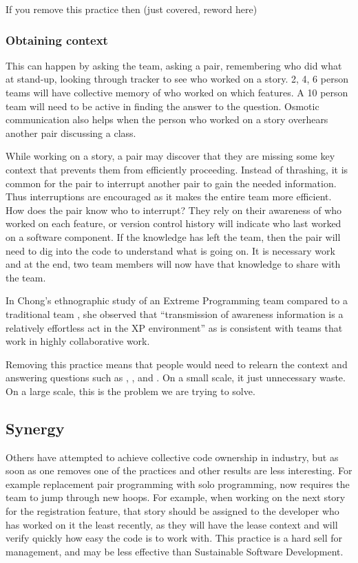 If you remove this practice then (just covered, reword here)

\subsubsection{Obtaining context}
This can happen by asking the team, asking a pair, remembering who did what at stand-up, looking through tracker to see who worked on a story. 2, 4, 6 person teams will have collective memory of who worked on which features. A 10 person team will need to be active in finding the answer to the question. Osmotic communication also helps when the person who worked on a story overhears another pair discussing a class.

While working on a story, a pair may discover that they are missing some key context that prevents them from efficiently proceeding. Instead of thrashing, it is common for the pair to interrupt another pair to gain the needed information. Thus interruptions are encouraged as it makes the entire team more efficient. How does the pair know who to interrupt? They rely on their awareness of who worked on each feature, or version control history will indicate who last worked on a software component. If the knowledge has left the team, then the pair will need to dig into the code to understand what is going on. It is necessary work and at the end, two team members will now have that knowledge to share with the team. 

In Chong's ethnographic study of an Extreme Programming team compared to a traditional team \cite{ChongNominum}, she observed that ``transmission of awareness information is a relatively effortless act in the XP environment” as is consistent with teams that work in highly collaborative work. 

Removing this practice means that people would need to relearn the context and answering questions such as , , and . On a small scale, it just unnecessary waste. On a large scale, this is the problem we are trying to solve.
\subsection{Synergy}

Others have attempted to achieve collective code ownership in industry, but as soon as one removes one of the practices and other results are less interesting. For example replacement pair programming with solo programming, now requires the team to jump through new hoops. For example, when working on the next story for the registration feature, that story should be assigned to the developer who has worked on it the least recently, as they will have the lease context and will verify quickly how easy the code is to work with. This practice is a hard sell for management, and may be less effective than Sustainable Software Development.
